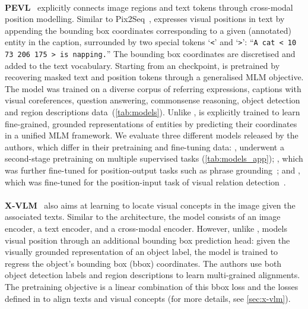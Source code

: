 \paragraph{}
\noindent\textbf{PEVL}~\cite{pevl} explicitly connects image regions and text tokens through cross-modal position modelling.
Similar to Pix2Seq~\cite{pix2seq_mtl}, \pevl expresses visual positions in text by appending the bounding box coordinates corresponding to a given (annotated) entity in the caption, surrounded by two special tokens `\texttt{<}' and `\texttt{>}': ``\texttt{A cat < 10 73 206 175 > is napping.}''
The bounding box coordinates are discretised and added to the text vocabulary.
Starting from an \albefl checkpoint, \pevl is pretrained by recovering masked text and position tokens through a generalised MLM objective.
The model was trained on a diverse corpus of referring expressions, captions with visual coreferences, question answering, commonsense reasoning, object detection and region descriptions data~(\cref{tab:models}).
Unlike \albef, \pevl is explicitly trained to learn fine-grained, grounded representations of entities by predicting their coordinates in a unified MLM framework.
We evaluate three different models released by the authors, which differ in their pretraining and fine-tuning data: \pevlpre, underwent a second-stage pretraining on multiple supervised tasks (\cref{tab:models_app}); \pevlgrd, which was further fine-tuned for position-output tasks such as phrase grounding~\cite{f30k_entities}; and \pevlvrd, which was fine-tuned for the position-input task of visual relation detection~\cite{visual_genome}.

\paragraph{}
\noindent\textbf{X-VLM}~\cite{x-vlm} also aims at learning to locate visual concepts in the image given the associated texts.
Similar to the \albef architecture, the model consists of an image encoder, a text encoder, and a cross-modal encoder. 
However, unlike \pevl, \xvlm models visual position through an additional bounding box prediction head: given the visually grounded representation of an object label, the model is trained to regress the object's bounding box (bbox) coordinates.
The authors use both object detection labels and region descriptions to learn multi-grained alignments.
The pretraining objective is a linear combination of this bbox loss and the losses defined in \albef to align texts and visual concepts (for more details, see \cref{sec:x-vlm}).

